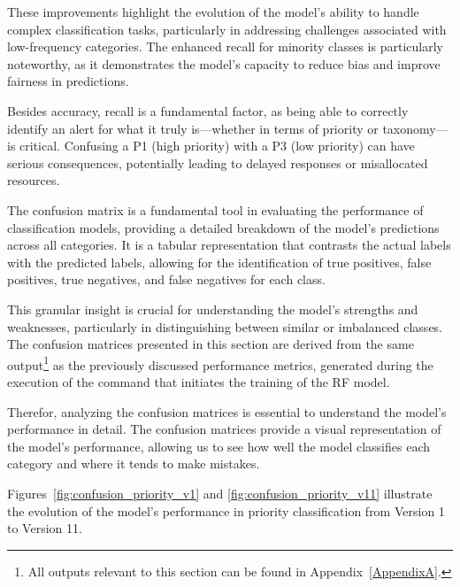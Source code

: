 These improvements highlight the evolution of the model's ability to handle complex classification tasks, particularly in addressing challenges associated with low-frequency categories. 
The enhanced recall for minority classes is particularly noteworthy, as it demonstrates the model's capacity to reduce bias and improve fairness in predictions.

Besides accuracy, recall is a fundamental factor, as being able to correctly identify an alert for what it truly is—whether in terms of priority or taxonomy—is critical. 
Confusing a P1 (high priority) with a P3 (low priority) can have serious consequences, potentially leading to delayed responses or misallocated resources.

The confusion matrix is a fundamental tool in evaluating the performance of classification models, providing a detailed breakdown of the model's predictions across all categories. 
It is a tabular representation that contrasts the actual labels with the predicted labels, allowing for the identification of true positives, false positives, true negatives, and false negatives for each class. 

This granular insight is crucial for understanding the model's strengths and weaknesses, particularly in distinguishing between similar or imbalanced classes. 
The confusion matrices presented in this section are derived from the same output\footnote{All outputs relevant to this section can be found in Appendix~\ref{AppendixA}.} as the previously discussed performance metrics, generated during the execution of the command that initiates the training of the RF model.

Therefor, analyzing the confusion matrices is essential to understand the model's performance in detail.
The confusion matrices provide a visual representation of the model's performance, allowing us to see how well the model classifies each category and where it tends to make mistakes.

Figures~\ref{fig:confusion_priority_v1} and \ref{fig:confusion_priority_v11} illustrate the evolution of the model's performance in priority classification from Version 1 to Version 11. 


